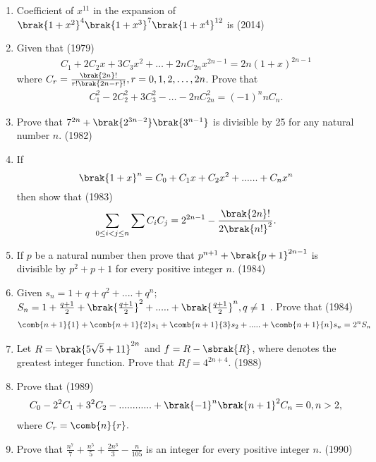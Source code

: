 \begin{enumerate}[label=\thesubsection.\arabic*,ref=\thesubsection.\theenumi]
\item  Coefficient of $x^{11}$ in the expansion of $ \brak{1+x^2}^4 \brak{1+x^3}^7 \brak{1+x^4}^{12}$ is \hfill(2014)

\begin{enumerate}
\end{enumerate}

 \item Given that  \hfill{(1979)} 
			  \begin{align*}
C_1 + 2C_2x + 3C_3x^2 + \dots + 2nC_{2n}x^{2n-1}   =    2n(1+x)^{2n-1} 
			  \end{align*}
		where $C_r =\frac{\brak{2n}!}{r!\brak{2n-r}!}, r=0,1,2,\dots,2n$.     Prove that  \begin{align*} 
		     C^2_1-2C_2^2+3C_3^2-\dots-2nC_{2n}^2  = (-1)^nnC_n. 
		     \end{align*}          
 \item Prove that $ 7^{2n} + \brak{2^{3n-2}}  \brak{3^{n-1}} $ is divisible by 25 for any natural number $ n$. \hfill{(1982)}  
\item If $$ \brak{1+x}^n= C_0 + C_1x +C_2x^2+......+C_nx^n $$ then show that \hfill{(1983)}
$$ \sum\limits_{0 \leq i<j \leq n}^{}\sum C_i C_j = 2^{2n-1}-\frac{\brak{2n}!} {2\brak{n!}^2} .$$ 
 \item If $ p $ be a natural number then prove that $ p^{n+1}+\brak{p+1}^{2n-1} $ is divisible by $ p^2+p+1 $ for every positive integer $n$. \hfill{(1984)} 
 \item Given  $ s_n = 1 + q + q^2 +....+q^n;$
		    $ S_n = 1 + \frac{q+1}{2}+\brak{\frac{q+1}{2}}^2+.....+\brak{\frac{q+1}{2}}^n,q\neq1 $ . Prove that
\hfill{(1984)}
		     \begin{align*} 
			    \comb{n+1}{1}+\comb{n+1}{2}s_1+\comb{n+1}{3}s_2+.....+\comb{n+1}{n}s_n=2^nS_n
		    \end{align*}    
  \item Let $ R =\brak{5\sqrt{5}+11}^{2n} $ and $ f = R -\sbrak{R} $, where \sbrak{} denotes the greatest integer function. Prove  that $ Rf =4^{2n+4 }.$  \hfill {(1988)}
\item Prove that \hfill{(1989)}
		    \begin{align*} 
		    C_0-2^2C_1+3^2C_2-............+\brak{-1}^n\brak{n+1}^2C_n =0, n>2,
		    \end{align*} where $C_r =\comb{n}{r}.$
 \item Prove that   $ \frac{n^7}{7}+\frac{n^5}{5}+\frac{2n^3}{3}-\frac{n}{105}$ is an integer for every positive integer $ n$. \hfill{(1990)}


\end{enumerate}
